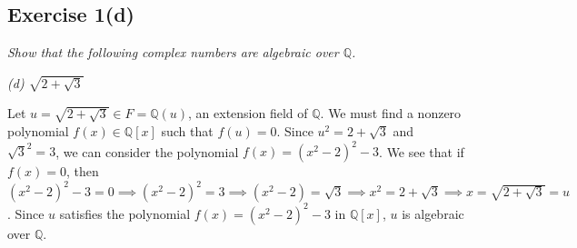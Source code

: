 \subsection*{Exercise 1(d)}
\textit{Show that the following complex numbers are algebraic over $\mathbb{Q}$.}

\textit{(d) $\sqrt{2 + \sqrt{3}}$}

\vspace{5 mm}
Let $u = \sqrt{2 + \sqrt{3}} \in F = \mathbb{Q}(u)$, an extension field of $\mathbb{Q}$. We must find a nonzero polynomial $f(x) \in \mathbb{Q}[x]$ such that $f(u) = 0$. Since $u^2 = 2 + \sqrt{3}$ and $\sqrt{3}^2 = 3$, we can consider the polynomial $f(x) = (x^2 - 2)^2 - 3$. We see that if $f(x) = 0$, then $(x^2 - 2)^2 - 3 = 0 \implies (x^2 - 2)^2 = 3 \implies (x^2 - 2) = \sqrt{3} \implies x^2 = 2 + \sqrt{3} \implies x = \sqrt{2 + \sqrt{3}} = u$. Since $u$ satisfies the polynomial $f(x)= (x^2 - 2)^2 - 3$ in $\mathbb{Q}[x]$, $u$ is algebraic over $\mathbb{Q}$.